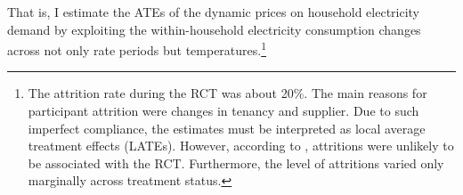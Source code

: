 That is, I estimate the ATEs of the dynamic prices on household electricity demand by exploiting the within-household electricity consumption changes across not only rate periods but temperatures.\footnote{The attrition rate during the RCT was about 20\%. The main reasons for participant attrition were changes in tenancy and supplier. Due to such imperfect compliance, the estimates must be interpreted as local average treatment effects (LATEs). However, according to \cite{Electricity-Smart-Metering-Customer-Behaviour-Trials-Findings-Report_CER_2011}, attritions were unlikely to be associated with the RCT. Furthermore, the level of attritions varied only marginally across treatment status.}
